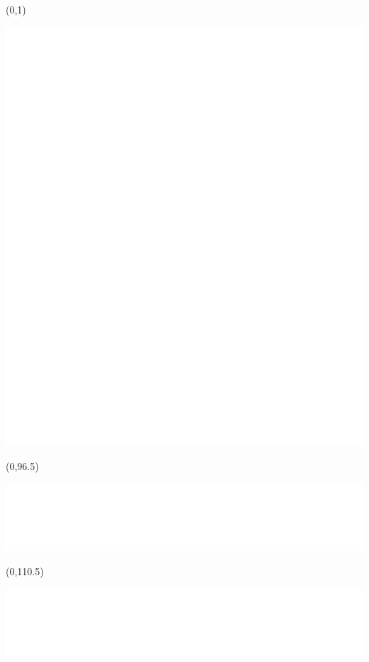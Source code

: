 \documentclass{extarticle}
\begin{document}
\pagecolor{black}
\pagestyle{empty}

\begin{textblock}{92}(0,1)%
\vfill
{\centerline{\noindent\includegraphics[scale=0.666]{tools/numbers-table.pdf}}}
\vfill
\end{textblock}

\begin{textblock}{92}(0,96.5)%
\vfill
{\centerline{\noindent\includegraphics[scale=0.666]{tools/czech.pdf}}}
\vfill
\end{textblock}

\begin{textblock}{92}(0,110.5)%
\vfill
{\centerline{\noindent\includegraphics[scale=0.666]{tools/greek-v2.pdf}}}
\vfill
\end{textblock}
\end{document}
